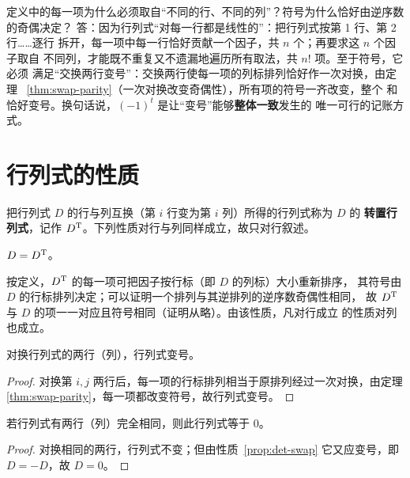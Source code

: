 \begin{qa}{定义中的每一项为什么必须取自“不同的行、不同的列”？符号为什么恰好由逆序数的奇偶决定？}
答：因为行列式“对每一行都是线性的”：把行列式按第 1 行、第 2 行……逐行
拆开，每一项中每一行恰好贡献一个因子，共 $n$ 个；再要求这 $n$ 个因子取自
不同列，才能既不重复又不遗漏地遍历所有取法，共 $n!$ 项。至于符号，它必须
满足“交换两行变号”：交换两行使每一项的列标排列恰好作一次对换，由定理
~\ref{thm:swap-parity}（一次对换改变奇偶性），所有项的符号一齐改变，整个
和恰好变号。换句话说，$(-1)^t$ 是让“变号”能够\textbf{整体一致}发生的
唯一可行的记账方式。
\end{qa}

\section{行列式的性质}\label{sec:det-properties}

把行列式 $D$ 的行与列互换（第 $i$ 行变为第 $i$ 列）所得的行列式称为 $D$ 的
\textbf{转置行列式}，记作 $D^{\mathrm{T}}$。下列性质对行与列同样成立，故只对行叙述。

\begin{property}[行列式与它的转置行列式相等]\label{prop:det-transpose}
$D=D^{\mathrm{T}}$。
\end{property}

按定义，$D^{\mathrm{T}}$ 的每一项可把因子按行标（即 $D$ 的列标）大小重新排序，
其符号由 $D$ 的行标排列决定；可以证明一个排列与其逆排列的逆序数奇偶性相同，
故 $D^{\mathrm{T}}$ 与 $D$ 的项一一对应且符号相同（证明从略）。由该性质，凡对行成立
的性质对列也成立。

\begin{property}\label{prop:det-swap}
对换行列式的两行（列），行列式变号。
\end{property}
\begin{proof}
对换第 $i,j$ 两行后，每一项的行标排列相当于原排列经过一次对换，由定理
\ref{thm:swap-parity}，每一项都改变符号，故行列式变号。
\end{proof}

\begin{property}[两行相同则为零]\label{prop:det-equal-rows}
若行列式有两行（列）完全相同，则此行列式等于 $0$。
\end{property}
\begin{proof}
对换相同的两行，行列式不变；但由性质~\ref{prop:det-swap} 它又应变号，即
$D=-D$，故 $D=0$。
\end{proof}

